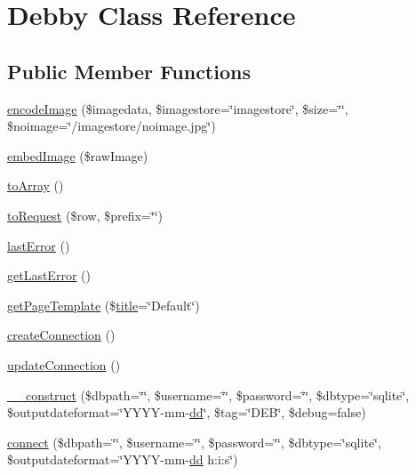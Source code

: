 \hypertarget{classDebby}{}\section{Debby Class Reference}
\label{classDebby}
\subsection*{Public Member Functions}
\begin{DoxyCompactItemize}
\item 
\hyperlink{classDebby_a0480262858a16cfc6e4cfe19b0e29e62}{encode\+Image} (\$imagedata, \$imagestore=\char`\"{}imagestore\char`\"{}, \$size=\char`\"{}\char`\"{}, \$noimage=\char`\"{}/imagestore/noimage.\+jpg\char`\"{})
\item 
\hyperlink{classDebby_af57d83562218d3a4b5e1de2f75a24cf0}{embed\+Image} (\$raw\+Image)
\item 
\hyperlink{classDebby_a4f0f3450a38e497552248a570b395353}{to\+Array} ()
\item 
\hyperlink{classDebby_a07e4bf3f7c9fa77beb52a09a38e936c8}{to\+Request} (\$row, \$prefix=\char`\"{}\char`\"{})
\item 
\hyperlink{classDebby_acbb276a47dbcd64d671a673df43be15a}{last\+Error} ()
\item 
\hyperlink{classDebby_ae10ec43fb6945948e4c936d798cc3bb3}{get\+Last\+Error} ()
\item 
\hyperlink{classDebby_ab4c3e5d14a404d1fdd6bc4ab078d64b8}{get\+Page\+Template} (\$\hyperlink{Shape_8php_ad264ad0cabbe965bf7f7c8a5ed6abebb}{title}=\char`\"{}Default\char`\"{})
\item 
\hyperlink{classDebby_a4cf1bbf921e33fee254129eb77fa4854}{create\+Connection} ()
\item 
\hyperlink{classDebby_af1c5109d660051d5d1d2f8e88d776cea}{update\+Connection} ()
\item 
\hyperlink{classDebby_a2dd53fded0dd64090ac538ef66d15bf1}{\+\_\+\+\_\+construct} (\$dbpath=\char`\"{}\char`\"{}, \$username=\char`\"{}\char`\"{}, \$password=\char`\"{}\char`\"{}, \$dbtype=\char`\"{}sqlite\char`\"{}, \$outputdateformat=\char`\"{}Y\+Y\+Y\+Y-\/mm-\/\hyperlink{Shape_8php_ab8bded9253c481cadc72d4df086e52b7}{dd}\char`\"{}, \$tag=\char`\"{}D\+E\+B\char`\"{}, \$debug=false)
\item 
\hyperlink{classDebby_a9f4e15cca354aa036ac823884c69cb61}{connect} (\$dbpath=\char`\"{}\char`\"{}, \$username=\char`\"{}\char`\"{}, \$password=\char`\"{}\char`\"{}, \$dbtype=\char`\"{}sqlite\char`\"{}, \$outputdateformat=\char`\"{}Y\+Y\+Y\+Y-\/mm-\/\hyperlink{Shape_8php_ab8bded9253c481cadc72d4df086e52b7}{dd} h\+:i\+:s\char`\"{})

\end{DoxyCompactItemize}
